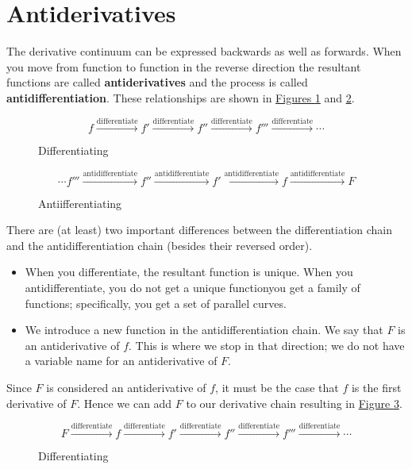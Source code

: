 \documentclass[12pt,]{book}
\newcommand{\terminology}[1]{\textbf{#1}}
\theoremstyle{plain}
\theoremstyle{definition}
\numberwithin{equation}{section}
\newcommand{\fd}[1]{#1'}
\newcommand{\sd}[1]{#1''}
\newcommand{\td}[1]{#1'''}
\begin{document}
\section[Antiderivatives]{Antiderivatives}\label{section-antiderivatives}
The derivative continuum can be expressed backwards as well as forwards.  When you move from function to function in the reverse direction the resultant functions are called \terminology{antiderivatives} and the process is called \terminology{antidifferentiation}.  These relationships are shown in \hyperref[figure-derivative-chain]{Figures \ref{figure-derivative-chain}} and \hyperref[figure-antiderivative-chain]{\ref{figure-antiderivative-chain}}.%
\begin{figure}
\centering
\[f\xrightarrow{\text{differentiate}}\fd{f}\xrightarrow{\text{differentiate}}\sd{f}\xrightarrow{\text{differentiate}}\td{f}\xrightarrow{\text{differentiate}}\cdots\]%
\caption{Differentiating\label{figure-derivative-chain}}
\end{figure}
\begin{figure}
\centering
\[\cdots\td{f}\xrightarrow{\text{antidifferentiate}}\sd{f}\xrightarrow{\text{antidifferentiate}}\fd{f}\xrightarrow{\text{antidifferentiate}}f\xrightarrow{\text{antidifferentiate}}F\]%
\caption{Antiifferentiating\label{figure-antiderivative-chain}}
\end{figure}
\par
There are (at least) two important differences between the differentiation chain and the antidifferentiation chain (besides their reversed order).%
\begin{itemize}[label=\textbullet]
\item{}When you differentiate, the resultant function is unique. When you antidifferentiate, you do not get a unique function\textemdash{}you get a family of functions; specifically, you get a set of parallel curves.\item{}We introduce a new function in the antidifferentiation chain. We say that \(F\) is an antiderivative of \(f\).  This is where we stop in that direction; we do not have a variable name for an antiderivative of \(F\).\end{itemize}
\par
Since \(F\) is considered an antiderivative of \(f\), it must be the case that \(f\) is the first derivative of \(F\). Hence we can add \(F\) to our derivative chain resulting in \hyperref[figure-longer-derivative-chain]{Figure \ref{figure-longer-derivative-chain}}.%
\begin{figure}
\centering
\[F\xrightarrow{\text{differentiate}}f\xrightarrow{\text{differentiate}}\fd{f}\xrightarrow{\text{differentiate}}\sd{f}\xrightarrow{\text{differentiate}}\td{f}\xrightarrow{\text{differentiate}}\cdots\]%
\caption{Differentiating\label{figure-longer-derivative-chain}}
\end{figure}
\typeout{************************************************}
\typeout{************************************************}
\end{document}
